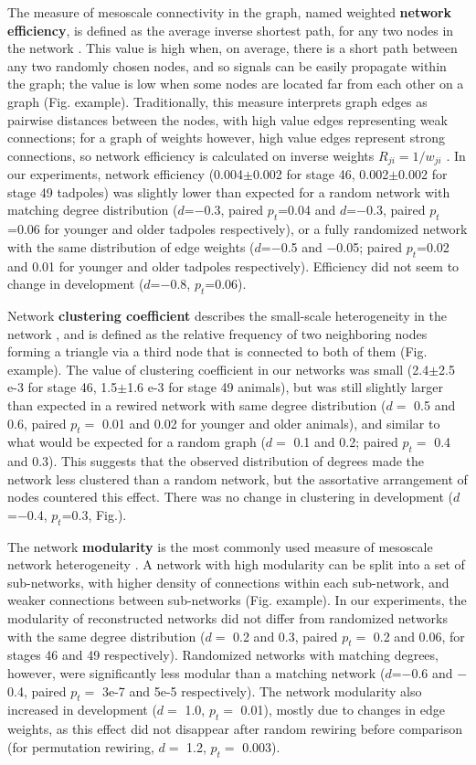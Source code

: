 \documentclass{article}
\begin{document}
The measure of mesoscale connectivity in the graph, named weighted \textbf{network efficiency}, is defined as the average inverse shortest path, for any two nodes in the network \citep{rubinov2010toolbox,latora2001efficiency}. This value is high when, on average, there is a short path between any two randomly chosen nodes, and so signals can be easily propagate within the graph; the value is low when some nodes are located far from each other on a graph (Fig. example). Traditionally, this measure interprets graph edges as pairwise distances between the nodes, with high value edges representing weak connections; for a graph of weights however, high value edges represent strong connections, so network efficiency is calculated on inverse weights $R_{ji} = 1/w_{ji}$ \citep{rubinov2010toolbox}. In our experiments, network efficiency (0.004$\pm$0.002 for stage 46, 0.002$\pm$0.002 for stage 49 tadpoles) was slightly lower than expected for a random network with matching degree distribution ($d$=$-$0.3, paired $p_t$=0.04 and $d$=$-$0.3, paired $p_t$=0.06 for younger and older tadpoles respectively), or a fully randomized network with the same distribution of edge weights ($d$=$-$0.5 and $-$0.05; paired $p_t$=0.02 and 0.01 for younger and older tadpoles respectively). Efficiency did not seem to change in development ($d$=$-$0.8, $p_t$=0.06).

Network \textbf{clustering coefficient} describes the small-scale heterogeneity in the network \citep{fagiolo2007}, and is defined as the relative frequency of two neighboring nodes forming a triangle via a third node that is connected to both of them (Fig. example). The value of clustering coefficient in our networks was small (2.4$\pm$2.5 e-3 for stage 46, 1.5$\pm$1.6 e-3 for stage 49 animals), but was still slightly larger than expected in a rewired network with same degree distribution ($d=$ 0.5 and 0.6, paired $p_t=$ 0.01 and 0.02 for younger and older animals), and similar to what would be expected for a random graph ($d=$ 0.1 and 0.2; paired $p_t=$ 0.4 and 0.3). This suggests that the observed distribution of degrees made the network less clustered than a random network, but the assortative arrangement of nodes countered this effect. There was no change in clustering in development ($d$=$-$0.4, $p_t$=0.3, Fig.).

The network \textbf{modularity} is the most commonly used measure of mesoscale network heterogeneity \citep{leicht2008community,newman2006modularity}. A network with high modularity can be split into a set of sub-networks, with higher density of connections within each sub-network, and weaker connections between sub-networks (Fig. example). In our experiments, the modularity of reconstructed networks did not differ from randomized networks with the same degree distribution ($d=$ 0.2 and 0.3, paired $p_t=$ 0.2 and 0.06, for stages 46 and 49 respectively). Randomized networks with matching degrees, however, were significantly less modular than a matching network ($d$=$-$0.6 and $-$0.4, paired $p_t =$ 3e-7 and 5e-5 respectively). The network modularity also increased in development ($d=$ 1.0, $p_t =$ 0.01), mostly due to changes in edge weights, as this effect did not disappear after random rewiring before comparison (for permutation rewiring, $d=$ 1.2, $p_t=$ 0.003).
\end{document}
